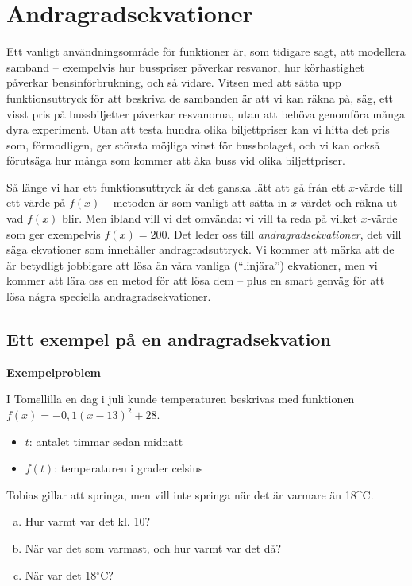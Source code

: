 \section{Andragradsekvationer}

Ett vanligt användningsområde för funktioner är, som tidigare sagt, att modellera samband -- exempelvis hur busspriser påverkar resvanor, hur körhastighet påverkar bensinförbrukning, och så vidare.
Vitsen med att sätta upp funktionsuttryck för att beskriva de sambanden är att vi kan räkna på, säg, ett visst pris på bussbiljetter påverkar resvanorna, utan att behöva genomföra många dyra experiment.
Utan att testa hundra olika biljettpriser kan vi hitta det pris som, förmodligen, ger största möjliga vinst för bussbolaget, och vi kan också förutsäga hur många som kommer att åka buss vid olika biljettpriser.

Så länge vi har ett funktionsuttryck är det ganska lätt att gå från ett $x$-värde till ett värde på $f(x)$ -- metoden är som vanligt att sätta in $x$-värdet och räkna ut vad $f(x)$ blir.
Men ibland vill vi det omvända: vi vill ta reda på vilket $x$-värde som ger exempelvis $f(x)=200$.
Det leder oss till \emph{andragradsekvationer}, det vill säga ekvationer som innehåller andragradsuttryck.
Vi kommer att märka att de är betydligt jobbigare att lösa än våra vanliga (``linjära'') ekvationer, men vi kommer att lära oss en metod för att lösa dem -- plus en smart genväg för att lösa några speciella andragradsekvationer.

\subsection{Ett exempel på en andragradsekvation}

\textbf{Exempelproblem}

I Tomellilla en dag i juli kunde temperaturen beskrivas med funktionen $f(x) = -0,1(x-13)^2+28$.
\begin{itemize}[label={}]
  \item $t$: antalet timmar sedan midnatt
  \item $f(t)$: temperaturen i grader celsius
\end{itemize}

Tobias gillar att springa, men vill inte springa när det är varmare än 18^{\circ}C.

\begin{enumerate}[(a)]
  \item Hur varmt var det kl. 10?
  \item När var det som varmast, och hur varmt var det då?
  \item När var det 18$^{\circ}$C?
\end{enumerate}


